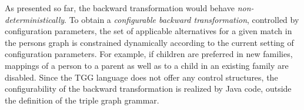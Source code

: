 As presented so far, the backward transformation would behave \emph{non-deterministically}. To obtain a \emph{configurable backward transformation}, controlled by configuration parameters, the set of applicable alternatives for a given match in the persons graph is constrained dynamically according to the current setting of configuration parameters. For example, if children are preferred in new families, mappings of a person to a parent as well as to a child in an existing family are disabled. Since the TGG language does not offer any control structures, the configurability of the backward transformation is realized by Java code, outside the definition of the triple graph grammar.

